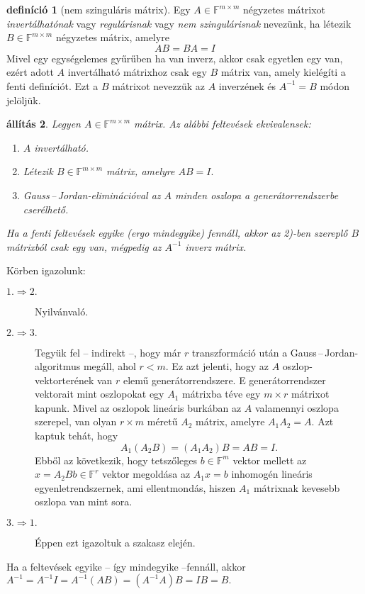 \documentclass[a4paper, showtrims]{memoir}
\makeatletter
\renewenvironment{proof}[1][\proofname]
    {\par\pushQED{\qed}%
    \normalfont \topsep6\p@\@plus6\p@\relax
    \trivlist
    \item[\hskip\labelsep
        \itshape
    #1\@addpunct{:}]\ignorespaces}
    {\popQED\endtrivlist\@endpefalse}
\theoremstyle{plain}
\newtheorem{proposition}{állítás}[chapter]
\theoremstyle{remark}
\theoremstyle{definition}
\newtheorem{definition}[proposition]{definíció}
\makeatother
\begin{document}
\begin{definition}[nem szinguláris mátrix]
	Egy $A\in\mathbb{F}^{m\times m}$ négyzetes mátrixot
	\emph{invertálhatónak} vagy
	\emph{regulárisnak} vagy \emph{nem szingulárisnak} nevezünk,
	ha létezik $B\in\mathbb{F}^{m\times m}$ négyzetes mátrix,
	amelyre
	\[
		AB=BA=I
	\]
	Mivel egy egységelemes gyűrűben ha van inverz, akkor csak egyetlen egy van,
	ezért adott $A$ invertálható mátrixhoz csak egy $B$ mátrix van, amely kielégíti a fenti definíciót.
	Ezt a $B$ mátrixot nevezzük az $A$ inverzének és $A^{-1}=B$ módon jelöljük.
\end{definition}

\begin{proposition}
	Legyen $A\in\mathbb{F}^{m\times m}$ mátrix. Az alábbi feltevések ekvivalensek:
	\begin{enumerate}
		\item
		      $A$ invertálható.
		\item
		      Létezik $B\in\mathbb{F}^{m\times m}$ mátrix, amelyre
		      \begin{math}
			      AB=I.
		      \end{math}
		\item
		      Gauss\,--\,Jordan-eliminációval  az $A$ minden oszlopa a generátorrendszerbe cserélhető.
	\end{enumerate}
	Ha a fenti feltevések egyike (ergo mindegyike) fennáll,
	akkor az 2)-ben szereplő $B$ mátrixból csak egy van,
	mégpedig az $A^{-1}$ inverz mátrix.
\end{proposition}
\begin{proof}
	Körben igazolunk:
	\begin{description}
		\item[$1.\Rightarrow 2.$] Nyilvánvaló.
		\item[$2.\Rightarrow 3.$]
		      Tegyük fel -- indirekt --, hogy már $r$ transzformáció után a Gauss\,--\,Jordan-algoritmus megáll, ahol $r<m$.
		      Ez azt jelenti, hogy az $A$ oszlop-vektorterének van $r$ elemű generátorrendszere.
		      E generátorrendszer vektorait mint oszlopokat egy $A_1$ mátrixba téve egy $m\times r$ mátrixot kapunk.
		      Mivel az oszlopok lineáris burkában az $A$ valamennyi oszlopa szerepel,
		      van olyan $r\times m$ méretű $A_2$ mátrix, amelyre
		      \(
		      A_1A_2=A.
		      \)
		      Azt kaptuk tehát, hogy
		      \[
			      A_1\left( A_2B \right)=\left( A_1A_2 \right)B=AB=I.
		      \]
		      Ebből az következik,
		      hogy tetszőleges $b\in\mathbb{F}^{m}$ vektor mellett az
		      \begin{math}
			      x=A_2Bb\in\mathbb{F}^{r}
		      \end{math}
		      vektor megoldása az $A_1x=b$ inhomogén lineáris egyenletrendszernek,
		      ami ellentmondás, hiszen $A_1$ mátrixnak kevesebb oszlopa van mint sora.
		\item[$3.\Rightarrow 1.$] Éppen ezt igazoltuk a szakasz elején.
	\end{description}
	Ha a feltevések egyike -- így mindegyike --fennáll, akkor
	\(
		A^{-1}=A^{-1}I=A^{-1}\left( AB \right)=\left( A^{-1}A \right)B=IB=B.%
	\)
\end{proof}
\end{document}
